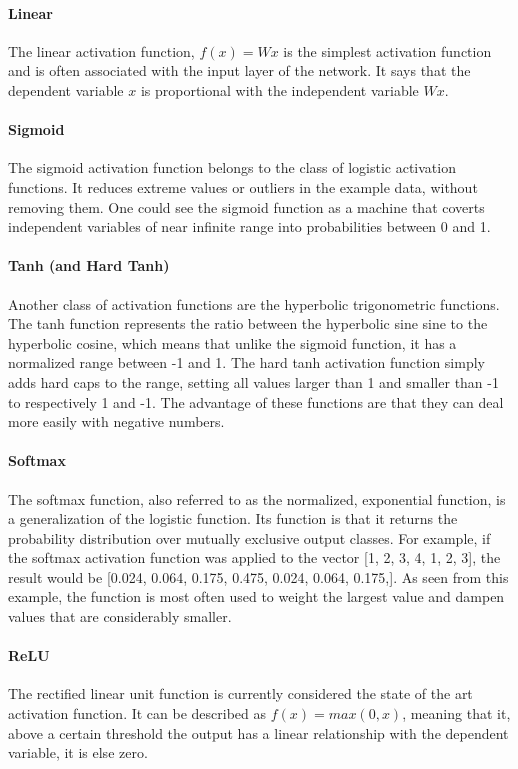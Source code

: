 \paragraph{Linear}
The linear activation function, $f(x) = Wx$ is the simplest activation function and is often associated with the input layer of the network. It says that the dependent variable $x$ is proportional with the independent variable $Wx$.

\paragraph{Sigmoid}
The sigmoid activation function belongs to the class of logistic activation functions. It reduces extreme values or outliers in the example data, without removing them. One could see the sigmoid function as a machine that coverts independent variables of near infinite range into probabilities between 0 and 1.

\paragraph{Tanh (and Hard Tanh)}
Another class of activation functions are the hyperbolic trigonometric functions. The tanh function represents the ratio between the hyperbolic sine sine to the hyperbolic cosine, which means that unlike the sigmoid function, it has a normalized range between -1 and 1. The hard tanh activation function simply adds hard caps to the range, setting all values larger than 1 and smaller than -1 to respectively 1 and -1. The advantage of these functions are that they can deal more easily with negative numbers.

\paragraph{Softmax}
The softmax function, also referred to as the normalized, exponential function, is a generalization of the logistic function. Its function is that it returns the probability distribution over mutually exclusive output classes. For example, if the softmax activation function was applied to the vector [1, 2, 3, 4, 1, 2, 3], the result would be [0.024, 0.064, 0.175, 0.475, 0.024, 0.064, 0.175,]. As seen from this example, the function is most often used to weight the largest value and dampen values that are considerably smaller. 

\paragraph{ReLU}
The rectified linear unit function is currently considered the state of the art activation function. It can be described as $f(x)=max(0,x)$, meaning that it, above a certain threshold the output has a linear relationship with the dependent variable, it is else zero.

